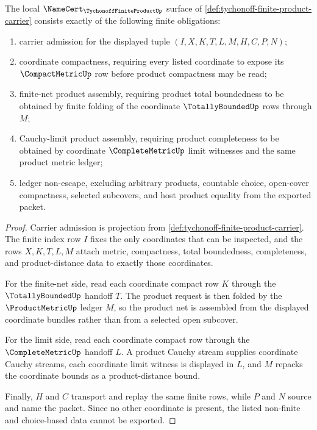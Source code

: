 \begin{theorem}
\label{thm:tychonoff-finite-product-namecert-obligations}
The local $\NameCert_{\TychonoffFiniteProductUp}$ surface of \autoref{def:tychonoff-finite-product-carrier} consists exactly of the following finite obligations:
\begin{enumerate}
\item carrier admission for the displayed tuple $(I,X,K,T,L,M,H,C,P,N)$;
\item coordinate compactness, requiring every listed coordinate to expose its $\CompactMetricUp$ row before product compactness may be read;
\item finite-net product assembly, requiring product total boundedness to be obtained by finite folding of the coordinate $\TotallyBoundedUp$ rows through $M$;
\item Cauchy-limit product assembly, requiring product completeness to be obtained by coordinate $\CompleteMetricUp$ limit witnesses and the same product metric ledger;
\item ledger non-escape, excluding arbitrary products, countable choice, open-cover compactness, selected subcovers, and host product equality from the exported packet.
\end{enumerate}
\end{theorem}
\begin{proof}
Carrier admission is projection from \autoref{def:tychonoff-finite-product-carrier}. The finite index row $I$ fixes the only coordinates that can be inspected, and the rows $X,K,T,L,M$ attach metric, compactness, total boundedness, completeness, and product-distance data to exactly those coordinates.

For the finite-net side, read each coordinate compact row $K$ through the $\TotallyBoundedUp$ handoff $T$. The product request is then folded by the $\ProductMetricUp$ ledger $M$, so the product net is assembled from the displayed coordinate bundles rather than from a selected open subcover.

For the limit side, read each coordinate compact row through the $\CompleteMetricUp$ handoff $L$. A product Cauchy stream supplies coordinate Cauchy streams, each coordinate limit witness is displayed in $L$, and $M$ repacks the coordinate bounds as a product-distance bound.

Finally, $H$ and $C$ transport and replay the same finite rows, while $P$ and $N$ source and name the packet. Since no other coordinate is present, the listed non-finite and choice-based data cannot be exported.
\end{proof}

